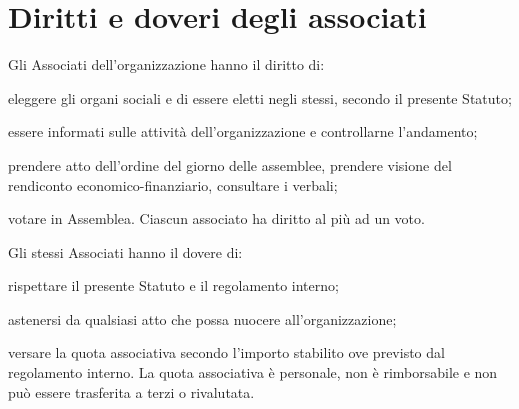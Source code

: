 \documentclass[legalpaper, 11pt]{exam}
\let\tempone\enumerate
\let\temptwo\endenumerate
\renewenvironment{enumerate}{\tempone\addtolength{\itemsep}{-0.45\baselineskip}}{\temptwo}
\begin{document}
{\section{Diritti e doveri degli associati}
\begin{enumerate}
 \item Gli Associati dell'organizzazione hanno il diritto di:
 \vspace{-5pt}
 \begin{enumerate}
  \item eleggere gli organi sociali e di essere eletti negli stessi, secondo il presente Statuto;
  \item essere informati sulle attività dell’organizzazione e controllarne l’andamento;
  \item prendere atto dell’ordine del giorno delle assemblee, prendere visione del rendiconto
  economico-finanziario, consultare i verbali;
  \item votare in Assemblea. Ciascun associato ha diritto al più ad un voto.
 \end{enumerate}
\item Gli stessi Associati hanno il dovere di:
\vspace{-5pt}
\begin{enumerate}
 \item rispettare il presente Statuto e il regolamento interno;
 \item astenersi da qualsiasi atto che possa nuocere all’organizzazione;
 \item versare la quota associativa secondo l’importo stabilito ove previsto dal regolamento interno. La quota associativa è personale, non è rimborsabile e non può essere trasferita a terzi o rivalutata.
\end{enumerate}

\end{enumerate}

}
\end{document}
